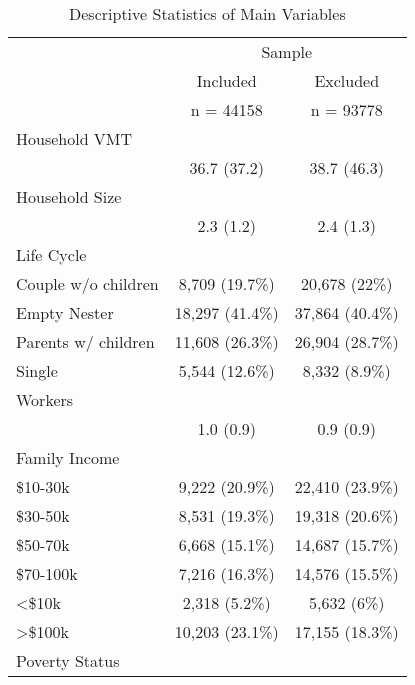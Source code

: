 \documentclass[numbered]{trbunofficial}
\begin{document}
\begin{table}[ !h ] 
\centering 
\caption{Descriptive Statistics of Main Variables}\label{tab:descr}
\begin{tabular}{ l c c }
\toprule
 &   \multicolumn{ 2 }{c}{ Sample }\\ 
  & Included & Excluded \\ 
 & n = 44158 & n = 93778 \\ 
 \midrule
Household VMT &   &  \\ 
\hspace{6pt}   & 36.7 (37.2) & 38.7 (46.3)\\ 
Household Size &   &  \\ 
\hspace{6pt}   & 2.3 (1.2) & 2.4 (1.3)\\ 
Life Cycle &   &  \\ 
\hspace{6pt}    Couple w/o children & 8,709 (19.7\%) & 20,678 (22\%)\\ 
\hspace{6pt}    Empty Nester & 18,297 (41.4\%) & 37,864 (40.4\%)\\ 
\hspace{6pt}    Parents w/ children & 11,608 (26.3\%) & 26,904 (28.7\%)\\ 
\hspace{6pt}    Single & 5,544 (12.6\%) & 8,332 (8.9\%)\\ 
Workers &   &  \\ 
\hspace{6pt}   & 1.0 (0.9) & 0.9 (0.9)\\ 
Family Income &   &  \\ 
\hspace{6pt}    \$10-30k & 9,222 (20.9\%) & 22,410 (23.9\%)\\ 
\hspace{6pt}    \$30-50k & 8,531 (19.3\%) & 19,318 (20.6\%)\\ 
\hspace{6pt}    \$50-70k & 6,668 (15.1\%) & 14,687 (15.7\%)\\ 
\hspace{6pt}    \$70-100k & 7,216 (16.3\%) & 14,576 (15.5\%)\\ 
\hspace{6pt}    <\$10k & 2,318 (5.2\%) & 5,632 (6\%)\\ 
\hspace{6pt}    >\$100k & 10,203 (23.1\%) & 17,155 (18.3\%)\\ 
Poverty Status &   &  \\ 

\end{tabular}
\end{table}
\end{document}
